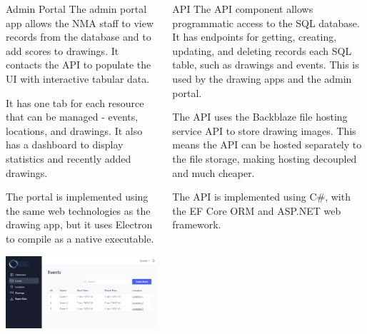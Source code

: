 \documentclass{beamer}
\begin{document}
\begin{frame}[fragile]
\begin{columns}[T]
\begin{column}{.46\textwidth}
    \begin{block}{Admin Portal}
        The admin portal app allows the NMA staff to view records from the database and to add scores to drawings. It contacts the API to populate the UI with interactive tabular data.
        \vspace{1ex}

        It has one tab for each resource that can be managed - events, locations, and drawings. It also has a dashboard to display statistics and recently added drawings.
        \vspace{1ex}

        The portal is implemented using the same web technologies as the drawing app, but it uses Electron to compile as a native executable. 
        \vspace{1ex}

        \begin{center}
            \includegraphics[width=0.75\linewidth]{images/admin-portal.png}
        \end{center}
    \end{block}

\end{column}

\begin{column}{.46\textwidth}

    \begin{block}{API}
        The API component allows programmatic access to the SQL database. It has endpoints for getting, creating, updating, and deleting records each SQL table, such as drawings and events. This is used by the drawing apps and the admin portal.
        \vspace{1ex}

        The API uses the Backblaze file hosting service API to store drawing images. This means the API can be hosted separately to the file storage, making hosting decoupled and much cheaper.
        \vspace{1ex}

        The API is implemented using C\#, with the EF Core ORM and ASP.NET web framework.
        \vspace{1ex}


\end{block}
\end{column}
\end{columns}
\end{frame}
\end{document}
